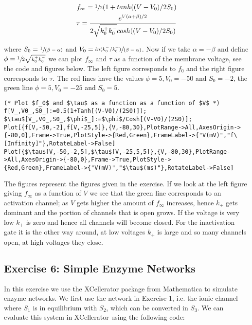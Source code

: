 \documentclass[11pt,a4paper,onecolumn]{article}
\begin{document}
\begin{align*}
  f_\infty = \sfrac{1}{2}(1 + tanh((V-V_0)/2S_0) \\
  \tau = \frac{e^{V(\alpha + \beta)/2}}{2 \sqrt{k_0^+ k_0^-} cosh((V-V_0)/2S_0)}
\end{align*}

where $S_0 = \sfrac{1}{(\beta - \alpha)}$ and $V_0 = \sfrac{ln(k_0^- / k_0^+)}{(\beta - \alpha)}$. Now if we take $\alpha = -\beta$ and define $\phi = \sfrac{1}{2\sqrt{k_0^+ k_0^-}}$ we can plot $f_\infty$ and $\tau$ as a function of the membrane voltage, see the code and figures below. The left figure corresponds to $f_0$ and the right figure corresponds to $\tau$. The red lines have the values $\phi = 5, V_0 = -50$ and $S_0 = -2$, the green line $\phi = 5, V_0 = -25$ and $S_0 = 5$.

\begin{lstlisting}[mathescape]
(* Plot $f_0$ and $\tau$ as a function as a function of $V$ *)
f[V_,V0_,S0_]:=0.5(1+Tanh[(V-V0)/(2S0)]);
$\tau$[V_,V0_,S0_,$\phi$_]:=$\phi$/Cosh[(V-V0)/(2S0)];
Plot[{f[V,-50,-2],f[V,-25,5]},{V,-80,30},PlotRange->All,AxesOrigin->{-80,0},Frame->True,PlotStyle->{Red,Green},FrameLabel->{"V(mV)","f\[Infinity]"},RotateLabel->False]
Plot[{$\tau$[V,-50,-2,5],$\tau$[V,-25,5,5]},{V,-80,30},PlotRange->All,AxesOrigin->{-80,0},Frame->True,PlotStyle->{Red,Green},FrameLabel->{"V(mV)","$\tau$(ms)"},RotateLabel->False]
\end{lstlisting}

\begin{figure}[H]
  \centering
\end{figure}

The figures represent the figures given in the exercise. If we look at the left figure giving $f_{\infty}$ as a function of $V$ we see that the green line corresponds to an activation channel; as $V$ gets higher the amount of $f_{\infty}$ increases, hence $k_+$ gets dominant and the portion of channels that is open grows. If the voltage is very low $k_+$ is zero and hence all channels will become closed. For the inactivation gate it is the other way around, at low voltages $k_+$ is large and so many channels open, at high voltages they close.

\subsection{Exercise 6: Simple Enzyme Networks}
In this exercise we use the XCellerator package from Mathematica to simulate enzyme networks. We first use the network in Exercise 1, i.e. the ionic channel where $S_1$ is in equilibrium with $S_2$, which can be converted in $S_3$. We can evaluate this system in XCellerator using the following code:
\end{document}
